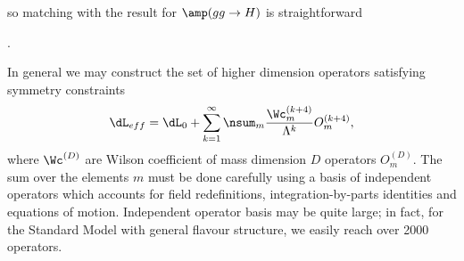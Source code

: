 so matching with the result for $\amp(gg \to H)$ is straightforward 
\begin{center}
    .
\end{center}
In general we may construct the set of higher dimension operators satisfying symmetry constraints 
\begin{equation}
    \dL_{eff} = \dL_0 + \sum_{k=1}^\infty\nsum_m\frac{\Wc_m^{(k + 4)}}{\Lambda^k}O_m^{(k + 4)},
\end{equation}
where $\Wc^{(D)}$ are Wilson coefficient of mass dimension $D$ operators $O_m^{(D)}$. The sum over the elements $m$ must be done carefully using a basis of independent operators which accounts for field redefinitions, integration-by-parts identities and equations of motion. Independent operator basis may be quite large; in fact, for the Standard Model with general flavour structure, we easily reach over 2000 operators. 